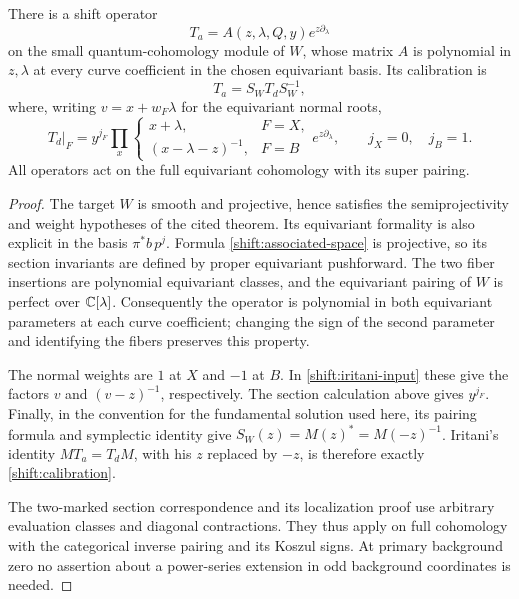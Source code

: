 \begin{proposition}
\label{shift:operator}
There is a shift operator
\[
 T_a=A(z,\lambda,Q,y)e^{z\partial_\lambda}
\]
on the small quantum-cohomology module of $W$, whose matrix $A$ is
polynomial in $z,\lambda$ at every curve coefficient in the chosen
equivariant basis.  Its calibration is
\begin{equation}
                   T_a=S_WT_dS_W^{-1},
 \label{shift:calibration}
\end{equation}
where, writing $v=x+w_F\lambda$ for the equivariant normal roots,
\begin{equation}
 T_d\big|_F
   =y^{j_F}
      \prod_x
       \begin{cases}
        x+\lambda,& F=X,\\[2pt]
        (x-\lambda-z)^{-1},& F=B
       \end{cases}
       e^{z\partial_\lambda},
 \qquad j_X=0,\quad j_B=1.
 \label{shift:fixed-formula}
\end{equation}
All operators act on the full equivariant cohomology with its super
pairing.
\end{proposition}

\begin{proof}
The target $W$ is smooth and projective, hence satisfies the
semiprojectivity and weight hypotheses of the cited theorem.
Its equivariant formality is also explicit in the basis
$\pi^*b\,p^j$.  Formula \eqref{shift:associated-space} is projective,
so its section invariants are defined by proper equivariant
pushforward.  The two fiber insertions are polynomial equivariant
classes, and the equivariant pairing of $W$ is perfect over
$\mathbb C[\lambda]$.  Consequently the operator is polynomial in both
equivariant parameters at each curve coefficient; changing the sign
of the second parameter and identifying the fibers preserves this
property.

The normal weights are $1$ at $X$ and $-1$ at $B$.  In
\eqref{shift:iritani-input} these give the factors $v$ and
$(v-z)^{-1}$, respectively.  The section calculation above gives
$y^{j_F}$.  Finally, in the convention for the fundamental solution
used here, its pairing formula and symplectic identity give
$S_W(z)=M(z)^*=M(-z)^{-1}$.  Iritani's identity
$M T_a=T_d M$, with his $z$ replaced by $-z$, is therefore exactly
\eqref{shift:calibration}.

The two-marked section correspondence and its localization proof
use arbitrary evaluation classes and diagonal contractions.  They
thus apply on full cohomology with the categorical inverse pairing
and its Koszul signs.  At primary background zero no assertion
about a power-series extension in odd background coordinates is
needed.
\end{proof}

